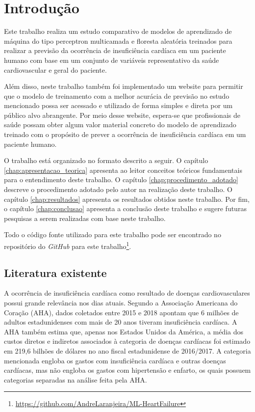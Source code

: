 \chapter{Introdução} \label{chap:introducao}

Este trabalho realiza um estudo comparativo de modelos de aprendizado de máquina do tipo perceptron multicamada e floresta aleatória treinados para realizar a previsão da ocorrência de insuficiência cardíaca em um paciente humano com base em um conjunto de variáveis representativo da saúde cardiovascular e geral do paciente.

Além disso, neste trabalho também foi implementado um website para permitir que o modelo de treinamento com a melhor acurácia de previsão no estudo mencionado possa ser acessado e utilizado de forma simples e direta por um público alvo abrangente. Por meio desse website, espera-se que profissionais de saúde possam obter algum valor material concreto do modelo de aprendizado treinado com o propósito de prever a ocorrência de insuficiência cardíaca em um paciente humano.

O trabalho está organizado no formato descrito a seguir. O capítulo \ref{chap:apresentacao_teorica} apresenta ao leitor conceitos teóricos fundamentais para o entendimento deste trabalho. O capítulo \ref{chap:procedimento_adotado} descreve o procedimento adotado pelo autor na realização deste trabalho. O capítulo \ref{chap:resultados} apresenta os resultados obtidos neste trabalho. Por fim, o capítulo \ref{chap:conclusao} apresenta a conclusão deste trabalho e sugere futuras pesquisas a serem realizadas com base neste trabalho.

Todo o código fonte utilizado para este trabalho pode ser encontrado no repositório do \textit{GitHub} para este trabalho\footnote{\url{https://github.com/AndreLaranjeira/ML-HeartFailure}}.

\section{Literatura existente}

A ocorrência de insuficiência cardíaca como resultado de doenças cardiovasculares possui grande relevância nos dias atuais. Segundo a Associação Americana do Coração (AHA), dados coletados entre 2015 e 2018 apontam que 6 milhões de adultos estadunidenses com mais de 20 anos tiveram insuficiência cardíaca\cite[p.8]{heart_disease2021}. A AHA também estima que, apenas nos Estados Unidos da América, a média dos custos diretos e indiretos associados à categoria de doenças cardíacas foi estimado em 219,6 bilhões de dólares no ano fiscal estadunidense de 2016/2017\cite[p.481]{heart_disease2021}. A categoria mencionada engloba os gastos com insuficiência cardíaca e outras doenças cardíacas, mas não engloba os gastos com hipertensão e enfarto, os quais possuem categorias separadas na análise feita pela AHA.

